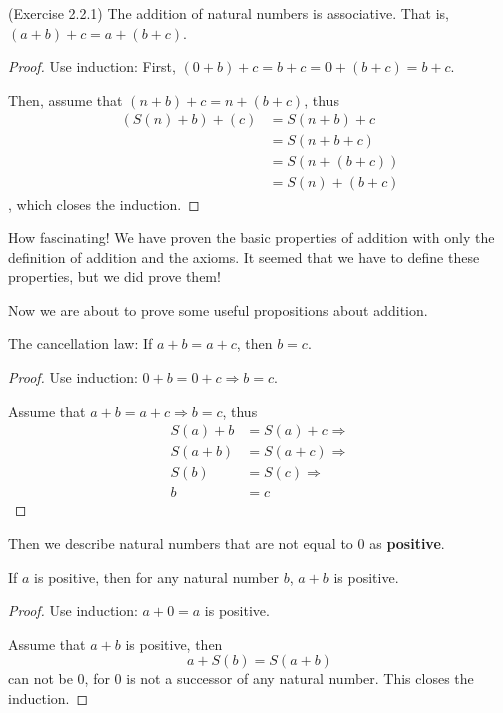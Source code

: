 \begin{prop}
(Exercise 2.2.1) \label{exercise2.2.1}
The addition of natural numbers is associative. That is, $(a+b)+c=a+(b+c)$.
\end{prop}
\begin{proof}
Use induction: First, $(0+b)+c=b+c=0+(b+c)=b+c$.

Then, assume that $(n+b)+c=n+(b+c)$, thus 
\begin{align*}
(S(n)+b)+(c)
&= S(n+b)+c\\
&= S(n+b+c)\\
&= S(n+(b+c)) \tag{By assumption}\\
&= S(n)+(b+c)
\end{align*}
, which closes the induction. \qedhere
\end{proof}

How fascinating! We have proven the basic properties of addition with only the definition of addition 
and the axioms. It seemed that we have to define these properties, but we did prove them!

Now we are about to prove some useful propositions about addition.

\begin{prop}
The cancellation law: If $a+b=a+c$, then $b=c$.
\end{prop}
\begin{proof}
Use induction: $0+b=0+c \Longrightarrow b=c$.

Assume that $a+b=a+c \Longrightarrow b=c$, thus 
\begin{align*}
S(a)+b &= S(a)+c \Longrightarrow \\
S(a+b) &= S(a+c) \Longrightarrow \\
S(b) &= S(c) \Longrightarrow \\
b &= c
\end{align*}
\end{proof}

Then we describe natural numbers that are not equal to 0 as \textbf{positive}. 

\begin{prop}
If $a$ is positive, then for any natural number $b$, $a+b$ is positive. \label{prop1}
\end{prop}
\begin{proof}
Use induction: $a+0=a$ is positive.

Assume that $a+b$ is positive, then 
\[
a+S(b) = S(a+b)
\]
can not be 0, for 0 is not a successor of any natural number. This closes the induction. \qedhere
\end{proof}

